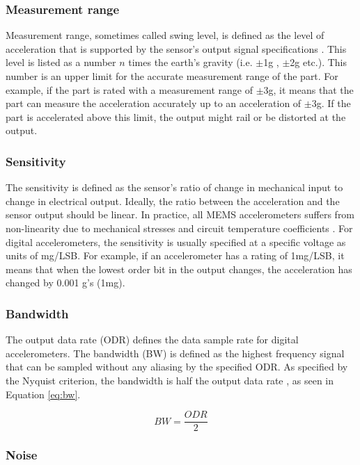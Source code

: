 \subsubsection{Measurement range}
Measurement range, sometimes called swing level, is defined as the level of acceleration that is supported by the sensor’s output signal specifications \cite{analog_accel_guide}. This level is listed as a number $n$ times the earth’s gravity (i.e. $\pm$1g , $\pm$2g etc.). This number is an upper limit for the accurate measurement range of the part. For example, if the part is rated with a measurement range of $\pm$3g, it means that the part can measure the acceleration accurately up to an acceleration of $\pm$3g.  If the part is accelerated above this limit, the output might rail or be distorted at the output.

\subsubsection{Sensitivity}
The sensitivity is defined as the sensor's ratio of change in mechanical input to change in electrical output. Ideally, the ratio between the acceleration and the sensor output should be linear. In practice, all MEMS accelerometers suffers from non-linearity due to mechanical stresses and circuit temperature coefficients  \cite{analog_accel_guide}. For digital accelerometers, the sensitivity is usually specified at a specific voltage as units of mg/LSB. For example, if an accelerometer has a rating of 1mg/LSB, it means that when the lowest order bit in the output changes, the acceleration has changed by 0.001 g's (1mg).

\subsubsection{Bandwidth}

The output data rate (ODR) defines the data sample rate for digital accelerometers. The bandwidth (BW) is defined as the highest frequency signal that can be sampled without any aliasing by the specified ODR. As specified by the Nyquist criterion, the bandwidth is half the output data rate \cite{analog_accel_guide}, as seen in Equation \ref{eq:bw}. 

\begin{equation}
BW = \frac{ODR}{2}
\label{eq:bw}
\end{equation}

\subsubsection{Noise}

